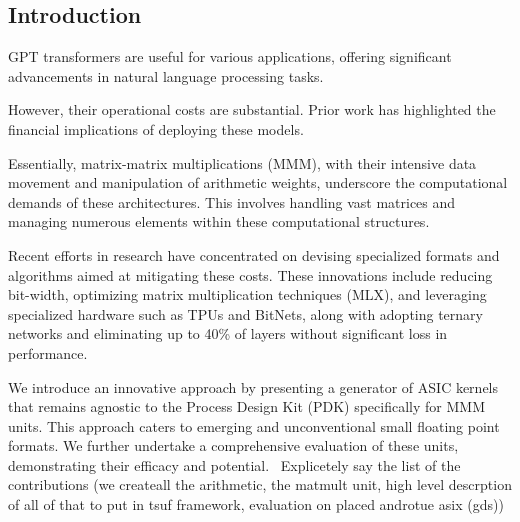 %
%
%
%
%

\subsection{Introduction}
\label{sec:introduction}

GPT transformers are useful for various applications, offering significant advancements in natural language processing tasks.

However, their operational costs are substantial.
Prior work has highlighted the financial implications of deploying these models.~\cite{luccioni2022estimating}

Essentially, matrix-matrix multiplications (MMM), with their intensive data movement and manipulation of arithmetic weights, underscore the computational demands of these architectures.
This involves handling vast matrices and managing numerous elements within these computational structures.

Recent efforts in research have concentrated on devising specialized formats and algorithms aimed at mitigating these costs.
These innovations include reducing bit-width, optimizing matrix multiplication techniques (MLX), and leveraging specialized hardware such as TPUs and BitNets, along with adopting ternary networks and eliminating up to 40\% of layers without significant loss in performance.~\cite{}

We introduce an innovative approach by presenting a generator of ASIC kernels that remains agnostic to the Process Design Kit (PDK) specifically for MMM units.
This approach caters to emerging and unconventional small floating point formats.
We further undertake a comprehensive evaluation of these units, demonstrating their efficacy and potential.~\cite{}
Explicetely say the list of the contributions (we createall the arithmetic, the matmult unit, high level descrption of all of that to put in tsuf framework, evaluation on placed androtue asix (gds))
